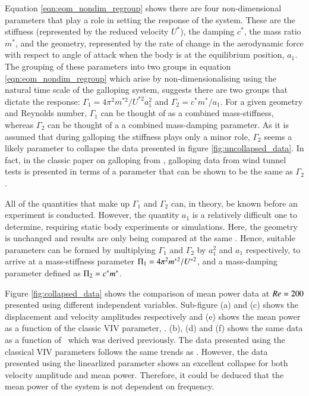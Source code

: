  Equation \ref{eqn:eom_nondim_regroup} shows there are four non-dimensional parameters that play a role in setting the response of the system. These are the stiffness (represented by the reduced velocity $U^*$), the damping $c^*$, the mass ratio $m^*$, and the geometry, represented by the rate of change in the aerodynamic force with respect to angle of attack when the body is at the equilibrium position, $a_1$. The grouping of these parameters into two groups in equation \ref{eqn:eom_nondim_regroup} which arise by non-dimensionalising using the natural time scale of the galloping system, suggests there are two groups that dictate the response: $\Gamma_1 = 4\pi^2m^{*2}/U^{*2}a_1^2$ and $\Gamma_2 = c^*m^*/a_1$. For a given geometry and Reynolds number, $\Gamma_1$ can be thought of as a combined mass-stiffness, whereas $\Gamma_2$ can be thought of a a combined mass-damping parameter. As it is assumed that during galloping the stiffness plays only a minor role, $\Gamma_2$ seems a likely parameter to collapse the data presented in figure \ref{fig:uncollapsed_data}. In fact, in the classic paper on galloping from \citet{Parkinson1964}, galloping data from wind tunnel tests is presented in terms of a parameter that can be shown to be the same as $\Gamma_2$.
 
 All of the quantities that make up $\Gamma_1$ and $\Gamma_2$ can, in theory, be known before an experiment is conducted. However, the quantity $a_1$ is a relatively difficult one to determine, requiring static body experiments or simulations. Here, the geometry is unchanged and results are only being compared at the same \reynoldsnumber. Hence, suitable parameters can be formed by multiplying $\Gamma_1$ and $\Gamma_2$ by $a_1^2$ and $a_1$ respectively, to arrive at a mass-stiffness parameter $\Pi_1 =  4\pi^2m^{*2}/U^{*2}$, and a mass-damping parameter defined as $\Pi_2 = c^*m^*$.
 
 
%   
  
   Figure \ref{fig:collapsed_data} shows the comparison of mean power data at $Re=200$ presented using different independent variables. Sub-figure (a) and (c) shows the displacement and velocity amplitudes respectively and (e) shows the mean power as a function of the classic VIV parameter, \ustar. (b), (d) and (f) shows the same data as a function of \massdamp \ which was derived previously. The data presented using the classical VIV parameters follows the same trends as \cite{Barrero-Gil2010a}. However, the data presented using the linearlized parameter shows an excellent collapse for both velocity amplitude and mean power. Therefore, it could be deduced that the mean power  of the system is not dependent on frequency.
   

